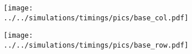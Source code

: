 \documentclass{article}
\begin{document}
\begin{figure}[p]
    \begin{subfigure}[b]{0.49\textwidth}
        \texttt{[image: ../../simulations/timings/pics/base\_col.pdf]}
        \caption{}
    \end{subfigure}
    \begin{subfigure}[b]{0.49\textwidth}
        \texttt{[image: ../../simulations/timings/pics/base\_row.pdf]}
        \caption{}
    \end{subfigure}
\end{figure}
\end{document}
